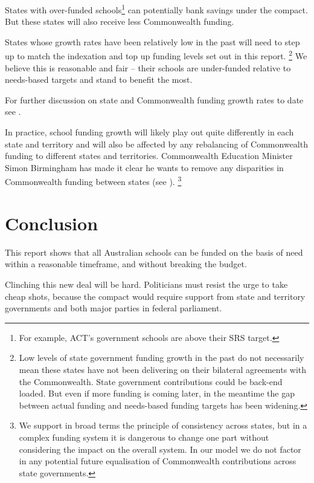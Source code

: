 \documentclass{grattan}
\begin{document}
States with over-funded schools\footnote{For example, ACT's government schools are above their SRS target.} can potentially bank savings under the compact.
But these states will also receive less Commonwealth funding.

States whose growth rates have been relatively low in the past will need to step up to match the indexation and top up funding levels set out in this report.%
\footnote{Low levels of state government funding growth in the past do not necessarily mean these states have not been delivering on their bilateral agreements with the Commonwealth. State government contributions could be back-end loaded. But even if more funding is coming later, in the meantime the gap between actual funding and needs-based funding targets has been widening.}
We believe this is reasonable and fair -- their schools are under-funded relative to needs-based targets and stand to benefit the most.


For further discussion on state and Commonwealth funding growth rates to date see .

In practice, school funding growth will likely play out quite differently in each state and territory and will also be affected by any rebalancing of Commonwealth funding to different states and territories.
Commonwealth Education Minister Simon Birmingham has made it clear he wants to remove any disparities in Commonwealth funding between states (see ).%
\footnote{We support in broad terms the principle of consistency across states, but in a complex funding system it is dangerous to change one part without considering the impact on the overall system. In our model we do not factor in any potential future equalisation of Commonwealth contributions across state governments.}

\section{Conclusion}\label{sec:conclusion}

This report shows that all Australian schools can be funded on the basis of need within a reasonable timeframe, and without breaking the budget.

Clinching this new deal will be hard.
Politicians must resist the urge to take cheap shots, because the compact would require support from state and territory governments and both major parties in federal parliament.
\end{document}
